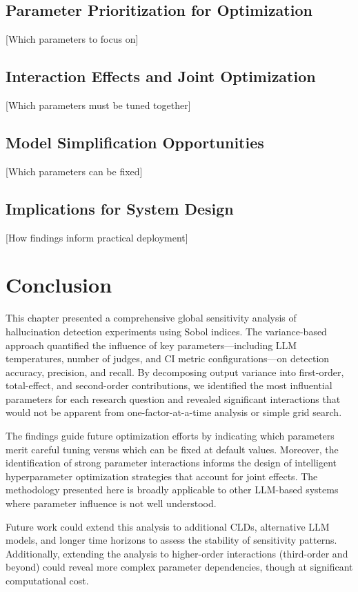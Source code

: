 \subsection{Parameter Prioritization for Optimization}

[Which parameters to focus on]

\subsection{Interaction Effects and Joint Optimization}

[Which parameters must be tuned together]

\subsection{Model Simplification Opportunities}

[Which parameters can be fixed]

\subsection{Implications for System Design}

[How findings inform practical deployment]

\section{Conclusion}

This chapter presented a comprehensive global sensitivity analysis of hallucination detection experiments using Sobol indices. The variance-based approach quantified the influence of key parameters---including LLM temperatures, number of judges, and CI metric configurations---on detection accuracy, precision, and recall. By decomposing output variance into first-order, total-effect, and second-order contributions, we identified the most influential parameters for each research question and revealed significant interactions that would not be apparent from one-factor-at-a-time analysis or simple grid search.

The findings guide future optimization efforts by indicating which parameters merit careful tuning versus which can be fixed at default values. Moreover, the identification of strong parameter interactions informs the design of intelligent hyperparameter optimization strategies that account for joint effects. The methodology presented here is broadly applicable to other LLM-based systems where parameter influence is not well understood.

Future work could extend this analysis to additional CLDs, alternative LLM models, and longer time horizons to assess the stability of sensitivity patterns. Additionally, extending the analysis to higher-order interactions (third-order and beyond) could reveal more complex parameter dependencies, though at significant computational cost.





